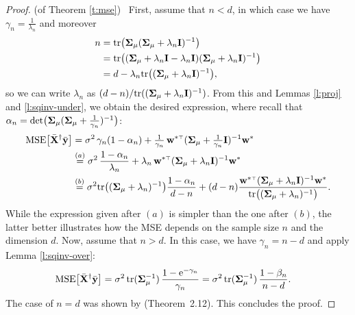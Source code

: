 \documentclass[11pt]{article}
\begin{document}
\begin{proof} (of Theorem \ref{t:mse}) \
  First, assume that $n<d$, in which case we have
  $\gamma_n=\frac1{\lambda_n}$ and moreover
  \begin{align*}
    n &= \mathrm{tr}\big(\mathbf{\Sigma}_\mu(\mathbf{\Sigma}_\mu+\lambda_n\mathbf I)^{-1}\big)\\
      &=\mathrm{tr}\big((\mathbf{\Sigma}_\mu+\lambda_n\mathbf I-\lambda_n\mathbf I)(\mathbf{\Sigma}_\mu+\lambda_n\mathbf I)^{-1}\big)\\
    &=d - \lambda_n\mathrm{tr}\big((\mathbf{\Sigma}_\mu+\lambda_n\mathbf I)^{-1}\big),    
  \end{align*}
so we can write $\lambda_n$ as $(d-n)/\mathrm{tr}((\mathbf{\Sigma}_\mu+\lambda_n\mathbf I)^{-1})$.
  From this and Lemmas \ref{l:proj} and \ref{l:sqinv-under}, we
obtain the desired expression, where recall
  that $\alpha_n = \det\!\big(\mathbf{\Sigma}_\mu (\mathbf{\Sigma}_\mu+\frac1{\gamma_n})^{-1}\big)$:
  \begin{align*}
    \MSE{\Xb^\dagger\ybb} &= \sigma^2\,\gamma_n(1-\alpha_n) +
    \tfrac1{\gamma_n} \,\w^{*\top}(\Sigmab_\mu+\tfrac1{\gamma_n}\I)^{-1}\w^*
    \\
    &\overset{(a)}{=}\sigma^2\,\frac{1-\alpha_n}{\lambda_n} +
    \lambda_n\,\w^{*\top}(\Sigmab_\mu+\lambda_n\I)^{-1}\w^*\\
    &\overset{(b)}{=}\sigma^2\tr\big((\Sigmab_\mu+\lambda_n)^{-1}\big)\frac{1-\alpha_n}{d-n}
      +
      (d-n)\frac{\w^{*\top}(\Sigmab_\mu+\lambda_n\I)^{-1}\w^*}
      {\tr\big((\Sigmab_\mu+\lambda_n)^{-1}\big)}.
  \end{align*}
  While the expression given after $(a)$ is simpler than the one
after $(b)$, the latter better illustrates how the MSE depends on
the sample size $n$ and the dimension $d$.
  Now, assume that $n>d$. In this case, we have $\gamma_n=n-d$ and apply Lemma
  \ref{l:sqinv-over}:
  \begin{align*}
    {\mathrm{MSE}\big[{\bar{\mathbf X}}^\dagger\bar{\mathbf y}\big]}
    &= \sigma^2\,\mathrm{tr}(\mathbf{\Sigma}_\mu^{-1})\,
\frac{1-\mathrm{e}^{-\gamma_n}}{\gamma_n}
=\sigma^2\,\mathrm{tr}(\mathbf{\Sigma}_\mu^{-1})
\,\frac{1-\beta_n}{n-d}.
  \end{align*}
The case of $n=d$ was shown by \cite{correcting-bias-journal}
(Theorem~2.12). This concludes the proof. 
\end{proof}
\end{document}
